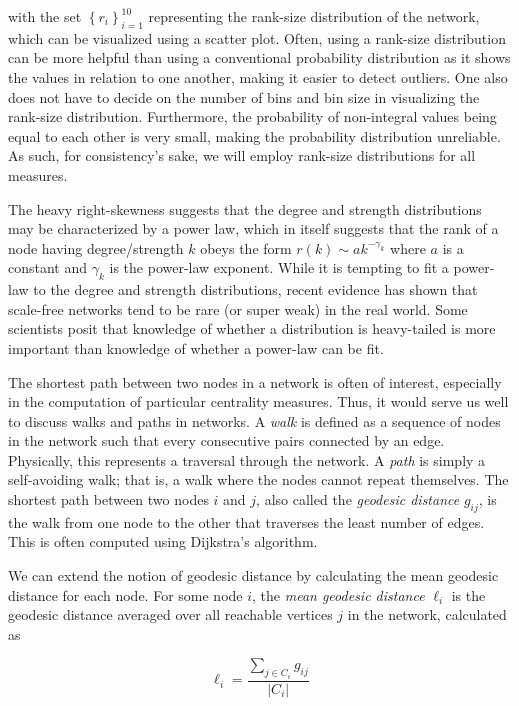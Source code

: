 \documentclass[12pt,letterpaper]{report}
\begin{document}
	with the set $\left\{r_i\right\}_{i=1}^{10}$ representing the rank-size distribution of the network, which can be visualized using a scatter plot. Often, using a rank-size distribution can be more helpful than using a conventional probability distribution as it shows the values in relation to one another, making it easier to detect outliers. One also does not have to decide on the number of bins and bin size in visualizing the rank-size distribution. Furthermore, the probability of non-integral values being equal to each other is very small, making the probability distribution unreliable. As such, for consistency's sake, we will employ rank-size distributions for all measures.
	
	The heavy right-skewness suggests that the degree and strength distributions may be characterized by a power law, which in itself suggests that the rank of a node having degree/strength $k$ obeys the form $r(k) \sim ak^{-\gamma_k}$ where $a$ is a constant and $\gamma_k$ is the power-law exponent. While it is tempting to fit a power-law to the degree and strength distributions, recent evidence has shown that scale-free networks tend to be rare (or super weak) in the real world. \cite{broido2019scale} Some scientists posit that knowledge of whether a distribution is heavy-tailed is more important than knowledge of whether a power-law can be fit. \cite{stumpf2012critical}
	
	The shortest path between two nodes in a network is often of interest, especially in the computation of particular centrality measures. Thus, it would serve us well to discuss walks and paths in networks. A \textit{walk} is defined as a sequence of nodes in the network such that every consecutive pairs connected by an edge. Physically, this represents a traversal through the network. A \textit{path} is simply a self-avoiding walk; that is, a walk where the nodes cannot repeat themselves. The shortest path between two nodes $i$ and $j$, also called the \textit{geodesic distance} $g_{ij}$, is the walk from one node to the other that traverses the least number of edges. This is often computed using Dijkstra's algorithm. \cite{cormen2009introduction}
	
	We can extend the notion of geodesic distance by calculating the mean geodesic distance for each node. For some node $i$, the \textit{mean geodesic distance} $\ell_i$ is the geodesic distance averaged over all reachable vertices $j$ in the network, calculated as
		
	\begin{equation}
	\label{eqn:307Ell} \ell_i = \frac{\sum_{j \in C_i} g_{ij}}{\left|C_i\right|}
	\end{equation}
\end{document}
